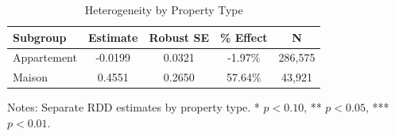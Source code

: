 \begin{table}[H]
\centering
\caption{Heterogeneity by Property Type}
\begin{threeparttable}
\begin{tabular}{lcccc}
\toprule
Subgroup & Estimate & Robust SE & \% Effect & N \\
\midrule
Appartement  &  -0.0199  &  0.0321  &  -1.97\%  &  286,575  \\
Maison  &  0.4551  &  0.2650  &  57.64\%  &  43,921  \\
\bottomrule
\end{tabular}
\begin{tablenotes}[flushleft]
\small
\item Notes: Separate RDD estimates by property type.  * $p<0.10$, ** $p<0.05$, *** $p<0.01$.
\end{tablenotes}
\end{threeparttable}
\label{tab:heterogeneity}
\end{table}
